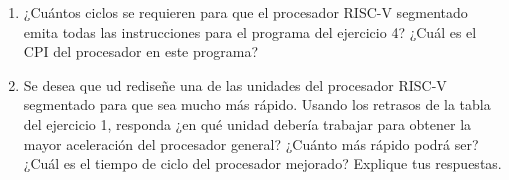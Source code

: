 \documentclass[letterpaper,12pt]{article}
\begin{document}
\begin{enumerate}
    \vspace{0.5cm}

    \item ¿Cuántos ciclos se requieren para que el procesador RISC-V segmentado emita todas las instrucciones para el programa del ejercicio 4? ¿Cuál es el CPI del procesador en este programa?

    \vspace{0.5cm}

    \item Se desea que ud rediseñe una de las unidades del procesador RISC-V segmentado para que sea mucho más rápido. Usando los retrasos de la tabla del ejercicio 1, responda ¿en qué unidad debería trabajar para obtener la mayor aceleración del procesador general? ¿Cuánto más rápido podrá ser? ¿Cuál es el tiempo de ciclo del procesador mejorado? Explique tus respuestas.

\end{enumerate}
\end{document}
